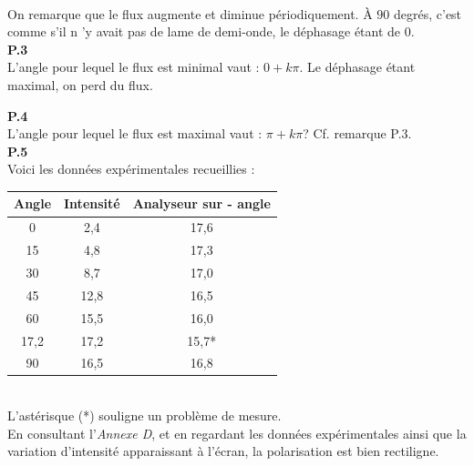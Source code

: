 \documentclass	[11pt, a4paper, openany]{book}
\begin{document}
\begin{center}
\end{center}\ \\
On remarque que le flux augmente et diminue périodiquement. À $90$ degrés, c'est comme s'il n 'y avait pas de lame de demi-onde, le déphasage étant de 0.\\

\textbf{P.3}\\
L'angle pour lequel le flux est minimal vaut : $0 + k\pi$. Le déphasage étant maximal, on perd du flux.

\textbf{P.4}\\
L'angle pour lequel le flux est maximal vaut : $\pi + k\pi$? Cf. remarque P.3.\\

\textbf{P.5}\\
Voici les données expérimentales recueillies : 
\begin{center}
\begin{tabular}{|c|c|c|}
\hline 
Angle & Intensité & Analyseur sur - angle \\ 
\hline 
0 & 2,4 & 17,6 \\ 
\hline 
15 & 4,8 & 17,3 \\ 
\hline 
30 & 8,7 & 17,0 \\ 
\hline 
45 & 12,8 & 16,5 \\ 
\hline 
60 & 15,5 & 16,0 \\ 
\hline 
17,2 & 17,2 & 15,7* \\ 
\hline 
90 & 16,5 & 16,8 \\ 
\hline 
\end{tabular} 
\end{center}\ \\
L'astérisque (*) souligne un problème de mesure.\\
En consultant l'\textit{Annexe D}, et en regardant les données expérimentales ainsi que la variation d'intensité apparaissant à l'écran, la polarisation est bien rectiligne.
\end{document}
